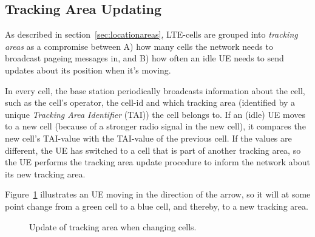 \subsection{Tracking Area Updating}
As described in section~\ref{sec:locationareas}, LTE-cells are grouped into \emph{tracking areas} as a compromise between A) how many cells the network needs to broadcast pageing messages in, and B) how often an idle UE needs to send updates about its position when it's moving.

In every cell, the base station periodically broadcasts information about the cell, such as the cell's operator, the cell-id and which tracking area (identified by a unique \emph{Tracking Area Identifier} (TAI)) the cell belongs to. If an (idle) UE moves to a new cell (because of a stronger radio signal in the new cell), it compares the new cell's TAI-value with the TAI-value of the previous cell. If the values are different, the UE has switched to a cell that is part of another tracking area, so the UE performs the tracking area update procedure to inform the network about its new tracking area.

Figure~\ref{fig:trackingareaupdate} illustrates an UE moving in the direction of the arrow, so it will at some point change from a green cell to a blue cell, and thereby, to a new tracking area.
\begin{figure}[htbp]
	\centering
	\caption{\label{fig:trackingareaupdate}Update of tracking area when changing cells.}
\end{figure}


